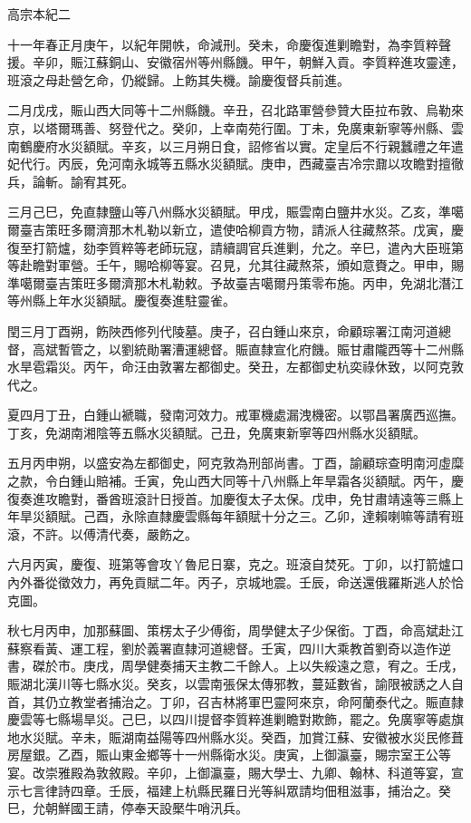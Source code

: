 
\begin{pinyinscope}
高宗本紀二

十一年春正月庚午，以紀年開帙，命減刑。癸未，命慶復進剿瞻對，為李質粹聲援。辛卯，賑江蘇銅山、安徽宿州等州縣饑。甲午，朝鮮入貢。李質粹進攻靈達，班滾之母赴營乞命，仍縱歸。上飭其失機。諭慶復督兵前進。

二月戊戌，賑山西大同等十二州縣饑。辛丑，召北路軍營參贊大臣拉布敦、烏勒來京，以塔爾瑪善、努登代之。癸卯，上幸南苑行圍。丁未，免廣東新寧等州縣、雲南鶴慶府水災額賦。辛亥，以三月朔日食，詔修省以實。定皇后不行親蠶禮之年遣妃代行。丙辰，免河南永城等五縣水災額賦。庚申，西藏臺吉冷宗鼐以攻瞻對擅徹兵，論斬。諭宥其死。

三月己巳，免直隸鹽山等八州縣水災額賦。甲戌，賑雲南白鹽井水災。乙亥，準噶爾臺吉策旺多爾濟那木札勒以新立，遣使哈柳貢方物，請派人往藏熬茶。戊寅，慶復至打箭爐，劾李質粹等老師玩寇，請續調官兵進剿，允之。辛巳，遣內大臣班第等赴瞻對軍營。壬午，賜哈柳等宴。召見，允其往藏熬茶，頒如意賚之。甲申，賜準噶爾臺吉策旺多爾濟那木札勒敕。予故臺吉噶爾丹策零布施。丙申，免湖北潛江等州縣上年水災額賦。慶復奏進駐靈雀。

閏三月丁酉朔，飭陜西修列代陵墓。庚子，召白鍾山來京，命顧琮署江南河道總督，高斌暫管之，以劉統勛署漕運總督。賑直隸宣化府饑。賑甘肅隴西等十二州縣水旱雹霜災。丙午，命汪由敦署左都御史。癸丑，左都御史杭奕祿休致，以阿克敦代之。

夏四月丁丑，白鍾山褫職，發南河效力。戒軍機處漏洩機密。以鄂昌署廣西巡撫。丁亥，免湖南湘陰等五縣水災額賦。己丑，免廣東新寧等四州縣水災額賦。

五月丙申朔，以盛安為左都御史，阿克敦為刑部尚書。丁酉，諭顧琮查明南河虛糜之款，令白鍾山賠補。壬寅，免山西大同等十八州縣上年旱霜各災額賦。丙午，慶復奏進攻瞻對，番酋班滾計日授首。加慶復太子太保。戊申，免甘肅靖遠等三縣上年旱災額賦。己酉，永除直隸慶雲縣每年額賦十分之三。乙卯，達賴喇嘛等請宥班滾，不許。以傅清代奏，嚴飭之。

六月丙寅，慶復、班第等會攻丫魯尼日寨，克之。班滾自焚死。丁卯，以打箭爐口內外番從徵效力，再免貢賦二年。丙子，京城地震。壬辰，命送還俄羅斯逃人於恰克圖。

秋七月丙申，加那蘇圖、策楞太子少傅銜，周學健太子少保銜。丁酉，命高斌赴江蘇察看黃、運工程，劉於義署直隸河道總督。壬寅，四川大乘教首劉奇以造作逆書，磔於市。庚戌，周學健奏捕天主教二千餘人。上以失綏遠之意，宥之。壬戌，賑湖北漢川等七縣水災。癸亥，以雲南張保太傳邪教，蔓延數省，諭限被誘之人自首，其仍立教堂者捕治之。丁卯，召吉林將軍巴靈阿來京，命阿蘭泰代之。賑直隸慶雲等七縣場旱災。己巳，以四川提督李質粹進剿瞻對欺飾，罷之。免廣寧等處旗地水災賦。辛未，賑湖南益陽等四州縣水災。癸酉，加賞江蘇、安徽被水災民修葺房屋銀。乙酉，賑山東金鄉等十一州縣衛水災。庚寅，上御瀛臺，賜宗室王公等宴。改崇雅殿為敦敘殿。辛卯，上御瀛臺，賜大學士、九卿、翰林、科道等宴，宣示七言律詩四章。壬辰，福建上杭縣民羅日光等糾眾請均佃租滋事，捕治之。癸巳，允朝鮮國王請，停奉天設檿牛哨汛兵。


\end{pinyinscope}
